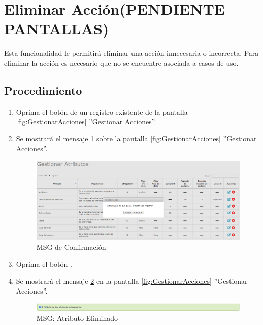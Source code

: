 \hypertarget{cv:eliminarAccion}{\section{Eliminar Acción(PENDIENTE PANTALLAS)}} \label{sec:eliminarAccion}

	Esta funcionalidad le permitirá eliminar una acción innecesaria o incorrecta. Para eliminar la acción es necesario que no se encuentre asociada a casos de uso.
		\subsection{Procedimiento}

			\begin{enumerate}
	
			\item Oprima el botón \IUBotonEliminar{} de un registro existente de la pantalla \ref{fig:GestionarAcciones} ''Gestionar Acciones''.
	
			\item Se mostrará el mensaje \ref{fig:confirmaEliminaAccion} sobre la pantalla \ref{fig:GestionarAcciones} ''Gestionar Acciones''.
			
			\begin{figure}[htbp!]
				\begin{center}
					\includegraphics[scale=0.5]{roles/lider/entidades/atributos/pantallas/IU12-1-3MSG10}
					\caption{MSG de Confirmación}
					\label{fig:confirmaEliminaAccion}
				\end{center}
			\end{figure}
						
			\item Oprima el botón \IUAceptar.
			
			\item Se mostrará el mensaje \ref{fig:accionEliminada} en la pantalla \ref{fig:GestionarAcciones} ''Gestionar Acciones''.
			
			\begin{figure}[htbp!]
				\begin{center}
					\includegraphics[scale=0.5]{roles/lider/entidades/atributos/pantallas/IU12-1-3MSG1}
					\caption{MSG: Atributo Eliminado}
					\label{fig:accionEliminada}
				\end{center}
			\end{figure}
			\end{enumerate}